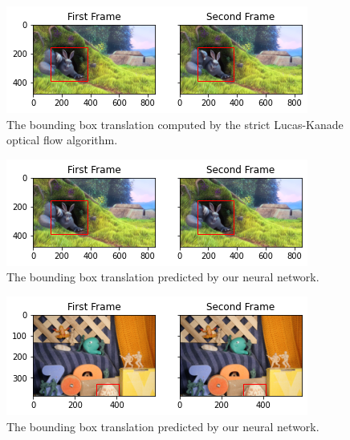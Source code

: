 \documentclass[]{article}
\begin{document}
    \begin{figure}[H]
        \centering
        \includegraphics[width=\textwidth]{output_14_0.png}
        \caption{The bounding box translation computed by the strict Lucas-Kanade optical flow algorithm.}
        \label{fig:optical_flow}
    \end{figure}

    \begin{figure}[H]
        \centering
        \includegraphics[width=\textwidth]{output_29_0.png}
        \caption{The bounding box translation predicted by our neural network.}
        \label{fig:optical_flow_neural_net}
    \end{figure}

    \begin{figure}[H]
        \centering
        \includegraphics[width=\textwidth]{index.png}
        \caption{The bounding box translation predicted by our neural network.}
        \label{fig:optical_flow_2}
    \end{figure}
\end{document}
